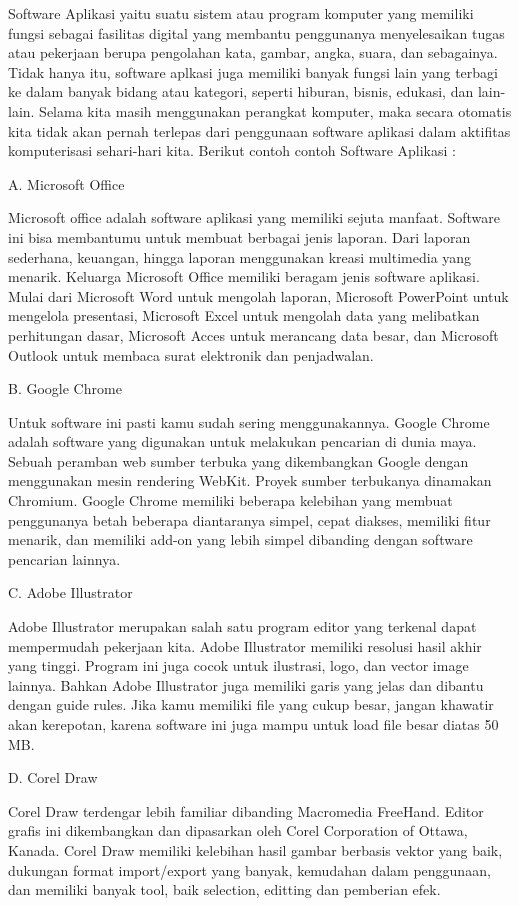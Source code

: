 \documentclass[11pt]{article}
\begin{document}
Software Aplikasi yaitu suatu sistem atau program komputer yang memiliki
fungsi sebagai fasilitas digital yang membantu penggunanya menyelesaikan
tugas atau pekerjaan berupa pengolahan kata, gambar, angka, suara, dan
sebagainya. Tidak hanya itu, software aplkasi juga memiliki banyak fungsi lain
yang terbagi ke dalam banyak bidang atau kategori, seperti hiburan, bisnis,
edukasi, dan lain-lain. Selama kita masih menggunakan perangkat komputer,
maka secara otomatis kita tidak akan pernah terlepas dari penggunaan
software aplikasi dalam aktifitas komputerisasi sehari-hari kita. Berikut contoh
contoh Software Aplikasi :

A. Microsoft Office

Microsoft office adalah software aplikasi yang memiliki sejuta manfaat.
Software ini bisa membantumu untuk membuat berbagai jenis laporan.
Dari laporan sederhana, keuangan, hingga laporan menggunakan kreasi
multimedia yang menarik.
Keluarga Microsoft Office memiliki beragam jenis software aplikasi.
Mulai dari Microsoft Word untuk mengolah laporan, Microsoft
PowerPoint untuk mengelola presentasi, Microsoft Excel untuk
mengolah data yang melibatkan perhitungan dasar, Microsoft Acces
untuk merancang data besar, dan Microsoft Outlook untuk membaca
surat elektronik dan penjadwalan.

B. Google Chrome

Untuk software ini pasti kamu sudah sering menggunakannya. Google
Chrome adalah software yang digunakan untuk melakukan pencarian di
dunia maya. Sebuah peramban web sumber terbuka yang
dikembangkan Google dengan menggunakan mesin rendering WebKit.
Proyek sumber terbukanya dinamakan Chromium. Google Chrome
memiliki beberapa kelebihan yang membuat penggunanya betah
beberapa diantaranya simpel, cepat diakses, memiliki fitur menarik, dan
memiliki add-on yang lebih simpel dibanding dengan software
pencarian lainnya.

C. Adobe Illustrator

Adobe Illustrator merupakan salah satu program editor yang terkenal
dapat mempermudah pekerjaan kita. Adobe Illustrator memiliki resolusi
hasil akhir yang tinggi.
Program ini juga cocok untuk ilustrasi, logo, dan vector image lainnya.
Bahkan Adobe Illustrator juga memiliki garis yang jelas dan dibantu
dengan guide rules. Jika kamu memiliki file yang cukup besar, jangan
khawatir akan kerepotan, karena software ini juga mampu untuk load
file besar diatas 50 MB.

D. Corel Draw

Corel Draw terdengar lebih familiar dibanding Macromedia FreeHand.
Editor grafis ini dikembangkan dan dipasarkan oleh Corel Corporation of
Ottawa, Kanada. Corel Draw memiliki kelebihan hasil gambar berbasis
vektor yang baik, dukungan format import/export yang banyak,
kemudahan dalam penggunaan, dan memiliki banyak tool, baik
selection, editting dan pemberian efek.
\end{document}
